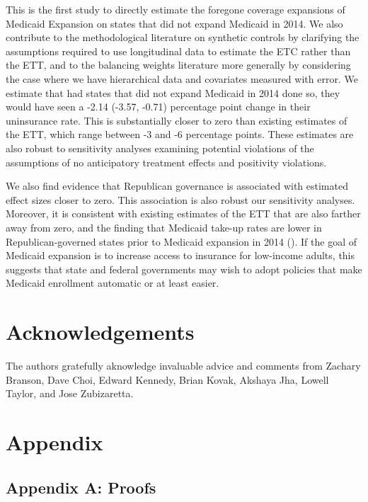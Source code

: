 \documentclass[12pt]{article}
\begin{document}
This is the first study to directly estimate the foregone coverage expansions of Medicaid Expansion on states that did not expand Medicaid in 2014. We also contribute to the methodological literature on synthetic controls by clarifying the assumptions required to use longitudinal data to estimate the ETC rather than the ETT, and to the balancing weights literature more generally by considering the case where we have hierarchical data and covariates measured with error. We estimate that had states that did not expand Medicaid in 2014 done so, they would have seen a -2.14 (-3.57, -0.71) percentage point change in their uninsurance rate. This is substantially closer to zero than existing estimates of the ETT, which range between -3 and -6 percentage points. These estimates are also robust to sensitivity analyses examining potential violations of the assumptions of no anticipatory treatment effects and positivity violations. 

We also find evidence that Republican governance is associated with estimated effect sizes closer to zero. This association is also robust our sensitivity analyses. Moreover, it is consistent with existing estimates of the ETT that are also farther away from zero, and the finding that Medicaid take-up rates are lower in Republican-governed states prior to Medicaid expansion in 2014 (\cite{sommers2012understanding}). If the goal of Medicaid expansion is to increase access to insurance for low-income adults, this suggests that state and federal governments may wish to adopt policies that make Medicaid enrollment automatic or at least easier.

\section{Acknowledgements}

The authors gratefully aknowledge invaluable advice and comments from Zachary Branson, Dave Choi, Edward Kennedy, Brian Kovak, Akshaya Jha, Lowell Taylor, and Jose Zubizaretta.

\cleardoublepage
 

\cleardoublepage

\section{Appendix}

\subsection{Appendix A: Proofs}
\end{document}
